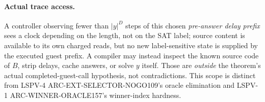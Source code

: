 \documentclass[11pt]{article}
\begin{document}
\paragraph{Actual trace access.}
A controller observing fewer than \(|y|^D\) steps of this chosen \emph{pre-answer delay prefix} sees a clock depending on the length, not on the SAT label; source content is available to its own charged reads, but no new label-sensitive state is supplied by the executed guest prefix. A compiler may instead inspect the known source code of \(B\), strip delays, cache answers, or solve \(y\) itself. Those are \emph{outside} the theorem's actual completed-guest-call hypothesis, not contradictions. This scope is distinct from LSPV-4 ARC-EXT-SELECTOR-NOGO109's oracle elimination and LSPV-1 ARC-WINNER-ORACLE157's winner-index hardness.
\end{document}
